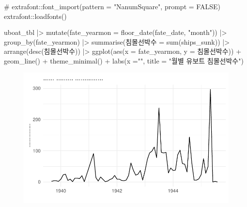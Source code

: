 \documentclass[
  letterpaper,
  chapter,a4paper,showtrims,openright,hidelinks]{oblivoir}
\newenvironment{Shaded}{\begin{snugshade}}{\end{snugshade}}
\newcommand{\AttributeTok}[1]{\textcolor[rgb]{0.40,0.45,0.13}{#1}}
\newcommand{\CommentTok}[1]{\textcolor[rgb]{0.37,0.37,0.37}{#1}}
\newcommand{\FunctionTok}[1]{\textcolor[rgb]{0.28,0.35,0.67}{#1}}
\newcommand{\NormalTok}[1]{\textcolor[rgb]{0.00,0.23,0.31}{#1}}
\newcommand{\OtherTok}[1]{\textcolor[rgb]{0.00,0.23,0.31}{#1}}
\newcommand{\SpecialCharTok}[1]{\textcolor[rgb]{0.37,0.37,0.37}{#1}}
\newcommand{\StringTok}[1]{\textcolor[rgb]{0.13,0.47,0.30}{#1}}
\begin{document}
\begin{Shaded}
\begin{Highlighting}[]
\CommentTok{\# extrafont::font\_import(pattern = "NanumSquare", prompt = FALSE)}
\NormalTok{extrafont}\SpecialCharTok{::}\FunctionTok{loadfonts}\NormalTok{()}

\NormalTok{uboat\_tbl }\SpecialCharTok{|\textgreater{}} 
  \FunctionTok{mutate}\NormalTok{(}\AttributeTok{fate\_yearmon =} \FunctionTok{floor\_date}\NormalTok{(fate\_date, }\StringTok{"month"}\NormalTok{)) }\SpecialCharTok{|\textgreater{}} 
  \FunctionTok{group\_by}\NormalTok{(fate\_yearmon) }\SpecialCharTok{|\textgreater{}} 
  \FunctionTok{summarise}\NormalTok{(침몰선박수 }\OtherTok{=} \FunctionTok{sum}\NormalTok{(ships\_sunk)) }\SpecialCharTok{|\textgreater{}} 
  \FunctionTok{arrange}\NormalTok{(}\FunctionTok{desc}\NormalTok{(침몰선박수)) }\SpecialCharTok{|\textgreater{}} 
  \FunctionTok{ggplot}\NormalTok{(}\FunctionTok{aes}\NormalTok{(}\AttributeTok{x =}\NormalTok{ fate\_yearmon, }\AttributeTok{y =}\NormalTok{ 침몰선박수)) }\SpecialCharTok{+}
    \FunctionTok{geom\_line}\NormalTok{() }\SpecialCharTok{+}
    \FunctionTok{theme\_minimal}\NormalTok{() }\SpecialCharTok{+}
    \FunctionTok{labs}\NormalTok{(}\AttributeTok{x =}\StringTok{""}\NormalTok{,}
         \AttributeTok{title =} \StringTok{"월별 유보트 침몰선박수"}\NormalTok{)}
\end{Highlighting}
\end{Shaded}

\begin{figure}[H]

{\centering \includegraphics{u_boats_files/figure-pdf/unnamed-chunk-5-1.pdf}

}

\end{figure}
\end{document}
